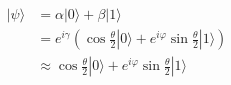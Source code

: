\documentclass[preview]{standalone}
\begin{document}
\begin{align*}
|\psi\rangle &= \alpha |0\rangle + \beta |1\rangle \\ &=e^{i\gamma} \left(\cos{\frac{\theta}{2}} |0\rangle + e^{i\varphi}\sin{\frac{\theta}{2}}|1\rangle\right) \\ & \approx \cos{\frac{\theta}{2} |0\rangle + e^{i\varphi}\sin{\frac{\theta}{2}} |1\rangle}
\end{align*}
\end{document}
